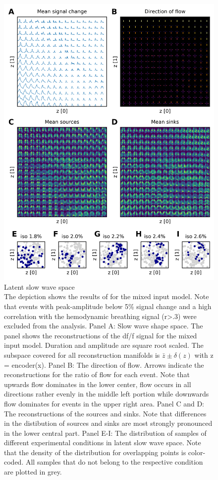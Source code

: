 \begin{figure}[!htb]
\centering
\includegraphics[width=\textwidth,height=\textheight,keepaspectratio]{Figures/latent_slow_wave_space}
\decoRule
\caption[Latent slow wave space]{Latent slow wave space\\The depiction shows the results of for the mixed input model. Note that events with peak-amplitude below 5\% signal change and a high correlation with the hemodynamic breathing signal (r>.3) were excluded from the analysis. Panel A: Slow wave shape space. The panel shows the reconstructions of the df/f signal for the mixed input model. Duration and amplitude are square root scaled. The subspace covered for all reconstruction manifolds is $\bar{z}\pm\delta\left(z\right)$ with z = encoder(x). Panel B: The direction of flow. Arrows indicate the reconstructions for the ratio of flow for each event. Note that upwards flow dominates in the lower center, flow occurs in all directions rather evenly in the middle left portion while downwards flow dominates for events in the upper right area. Panel C and D: The reconstructions of the sources and sinks. Note that differences in the distibution of sources and sinks are most strongly pronounced in the lower central part. Panel E-I: The distribution of samples of different experimental conditions in latent slow wave space. Note that the density of the distribution for overlapping points is color-coded. All samples that do not belong to the respective condition are plotted in grey.}
\label{fig:latent_slow_wave_space}
\end{figure}

